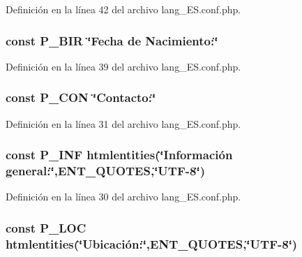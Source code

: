 Definición en la línea 42 del archivo lang\-\_\-\-E\-S.\-conf.\-php.

\hypertarget{lang__ES_8conf_8php_aef69547e66d1ba07f314ea1c00149ecb}{
\subsubsection[{P\-\_\-\-B\-I\-R}]{\setlength{\rightskip}{0pt plus 5cm}const P\-\_\-\-B\-I\-R \char`\"{}Fecha de Nacimiento\-:\char`\"{}}}\label{lang__ES_8conf_8php_aef69547e66d1ba07f314ea1c00149ecb}


Definición en la línea 39 del archivo lang\-\_\-\-E\-S.\-conf.\-php.

\hypertarget{lang__ES_8conf_8php_ad3f5472a251165b7eb05aa8e4084a10c}{
\subsubsection[{P\-\_\-\-C\-O\-N}]{\setlength{\rightskip}{0pt plus 5cm}const P\-\_\-\-C\-O\-N \char`\"{}Contacto\-:\char`\"{}}}\label{lang__ES_8conf_8php_ad3f5472a251165b7eb05aa8e4084a10c}


Definición en la línea 31 del archivo lang\-\_\-\-E\-S.\-conf.\-php.

\hypertarget{lang__ES_8conf_8php_a31d1da665267d377fc62572b9b2e09fa}{
\subsubsection[{P\-\_\-\-I\-N\-F}]{\setlength{\rightskip}{0pt plus 5cm}const P\-\_\-\-I\-N\-F htmlentities(\char`\"{}Información general\-:\char`\"{},E\-N\-T\-\_\-\-Q\-U\-O\-T\-E\-S,\char`\"{}U\-T\-F-\/8\char`\"{})}}\label{lang__ES_8conf_8php_a31d1da665267d377fc62572b9b2e09fa}


Definición en la línea 30 del archivo lang\-\_\-\-E\-S.\-conf.\-php.

\hypertarget{lang__ES_8conf_8php_ac5de6ba666c926e6b375d153846010c3}{
\subsubsection[{P\-\_\-\-L\-O\-C}]{\setlength{\rightskip}{0pt plus 5cm}const P\-\_\-\-L\-O\-C htmlentities(\char`\"{}Ubicación\-:\char`\"{},E\-N\-T\-\_\-\-Q\-U\-O\-T\-E\-S,\char`\"{}U\-T\-F-\/8\char`\"{})}}\label{lang__ES_8conf_8php_ac5de6ba666c926e6b375d153846010c3}


